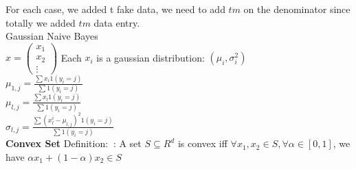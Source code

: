 \documentclass[12pt]{article}
\newcommand{\defi}{{\color{blue} Definition: $\ $}}
\begin{document}
        For each case, we added t fake data, we need to add $tm$ on the denominator since totally we added $tm$ data entry.\\
        Gaussian Naive Bayes\\
        $x = \begin{pmatrix}
            x_1 \\ x_2 \\ \vdots
        \end{pmatrix}$
        Each $x_i$ is a gaussian distribution: $(\mu_i, \sigma_i^2)$\\
        $\mu_{1,j} = \frac{\sum x_i 1(y_i = j)}{\sum 1(y_i = j)}$\\
        $\mu_{l,j} = \frac{\sum x_l 1(y_i = j)}{\sum 1(y_i = j)}$\\
        $\sigma_{l,j} = \frac{\sum (x_l^i - \mu_{l,j})^2 1(y_i = j)}{\sum 1(y_i = j)}$\\

        \textbf{Convex Set} \defi: A set $S \subseteq R^d$ is convex iff $\forall x_1, x_2 \in S, \forall \alpha \in [0,1]$, we have $\alpha x_1 + (1-\alpha)x_2 \in S$ 
        

    
\end{document}
